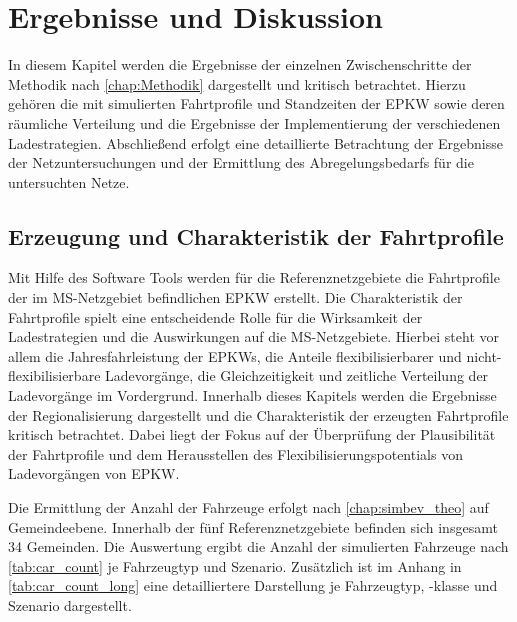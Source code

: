 \section{Ergebnisse und Diskussion}\label{chap:results}

In diesem Kapitel werden die Ergebnisse der einzelnen Zwischenschritte der Methodik nach \autoref{chap:Methodik} dargestellt und kritisch betrachtet.
Hierzu gehören die mit  simulierten Fahrtprofile und Standzeiten der \gls{EPKW} sowie deren räumliche Verteilung und die Ergebnisse der Implementierung der verschiedenen Ladestrategien.
Abschließend erfolgt eine detaillierte Betrachtung der Ergebnisse der Netzuntersuchungen und der Ermittlung des Abregelungsbedarfs für die untersuchten Netze.


\subsection{Erzeugung und Charakteristik der Fahrtprofile}

Mit Hilfe des Software Tools  werden für die Referenznetzgebiete die Fahrtprofile der im \gls{MS}-Netzgebiet befindlichen \gls{EPKW} erstellt.
Die Charakteristik der Fahrtprofile spielt eine entscheidende Rolle für die Wirksamkeit der Ladestrategien und die Auswirkungen auf die \gls{MS}-Netzgebiete.
Hierbei steht vor allem die Jahresfahrleistung der \glspl{EPKW}, die Anteile flexibilisierbarer und nicht-flexibilisierbare Ladevorgänge, die Gleichzeitigkeit und zeitliche Verteilung der Ladevorgänge im Vordergrund.
Innerhalb dieses Kapitels werden die Ergebnisse der Regionalisierung dargestellt und die Charakteristik der erzeugten Fahrtprofile kritisch betrachtet.
Dabei liegt der Fokus auf der Überprüfung der Plausibilität der Fahrtprofile und dem Herausstellen des Flexibilisierungspotentials von Ladevorgängen von \gls{EPKW}.\medskip

Die Ermittlung der Anzahl der Fahrzeuge erfolgt nach \autoref{chap:simbev_theo} auf Gemeindeebene.
Innerhalb der fünf Referenznetzgebiete befinden sich insgesamt \num{34} Gemeinden.
Die Auswertung ergibt die Anzahl der simulierten Fahrzeuge nach \autoref{tab:car_count} je Fahrzeugtyp und Szenario.
Zusätzlich ist im Anhang in \autoref{tab:car_count_long} eine detailliertere Darstellung je Fahrzeugtyp, -klasse und Szenario dargestellt.



